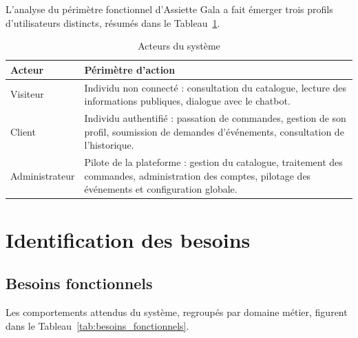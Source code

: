 L'analyse du périmètre fonctionnel d'Assiette Gala a fait émerger trois profils d'utilisateurs distincts, résumés dans le Tableau~\ref{tab:acteurs}.

\begin{table}[H]
    \centering
    \caption{Acteurs du système}
    \label{tab:acteurs}
    \renewcommand{\arraystretch}{1.4}
    \begin{tabular}{|p{3cm}|p{9.5cm}|}
        \hline
        \textbf{Acteur} & \textbf{Périmètre d'action} \\
        \hline
        Visiteur & Individu non connecté : consultation du catalogue, lecture des informations publiques, dialogue avec le chatbot. \\
        \hline
        Client & Individu authentifié : passation de commandes, gestion de son profil, soumission de demandes d'événements, consultation de l'historique. \\
        \hline
        Administrateur & Pilote de la plateforme : gestion du catalogue, traitement des commandes, administration des comptes, pilotage des événements et configuration globale. \\
        \hline
    \end{tabular}
\end{table}

\section{Identification des besoins}

\subsection{Besoins fonctionnels}

Les comportements attendus du système, regroupés par domaine métier, figurent dans le Tableau~\ref{tab:besoins_fonctionnels}.

